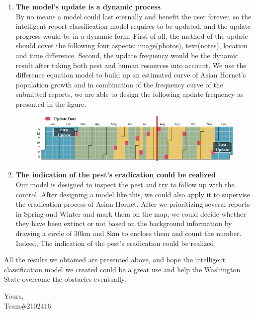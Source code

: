 \documentclass{mcmthesis}
\begin{document}
\begin{enumerate}
		\item \textbf{The model's update is a dynamic process}\\
		By no means a model could last eternally and benefit the user forever, so the intelligent report classification model requires to be updated, and the update progress would be in a dynamic form. First of all, the method of the update should cover the following four aspects: image(photos), text(notes), location and time difference. Second, the update frequency would be the dynamic result after taking both pest and human resources into account. We use the difference equation model to build up an estimated curve of Asian Hornet's population growth and in combination of the frequency curve of the submitted reports, we are able to design the following update frequency as presented in the figure.
		\begin{figure}[h]
			\centering
			\includegraphics[scale=0.5]{calendar.png}
		\end{figure}
		\item \textbf{The indication of the pest's eradication could be realized }\\
		Our model is designed to inspect the pest and try to follow up with the control. After designing a model like this, we could also apply it to supervise the eradication process of Asian Hornet. After we prioritizing several reports in Spring and Winter and mark them on the map, we could decide whether they have been extinct or not based on the background information by drawing a circle of 30km and 8km to enclose them and count the number. Indeed, The indication of the pest's eradication could be realized
	\end{enumerate}
	\quad All the results we obtained are presented above, and hope the intelligent classification model we created could be a great use and help the Washington State overcome the obstacles eventually.
	\begin{flushright}
		Yours,\\
	Team\#2102416
	\end{flushright}
	
\newpage

%
\end{document}
